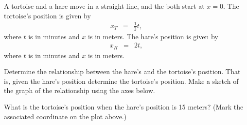 \begin{problem}
\begin{subproblem}
  \end{subproblem}

\clearpage

\item A tortoise and a hare move in a straight line, and the both
  start at $x=0$. The tortoise's position is given by
  \begin{eqnarray*}
    x_T & = & \frac{1}{2} t,
  \end{eqnarray*}
  where $t$ is in minutes and $x$ is in meters.  The hare's position
  is given by
  \begin{eqnarray*}
    x_H & = & 2 t,
  \end{eqnarray*}
  where $t$ is in minutes and $x$ is in meters.

  Determine the relationship between the hare's and the tortoise's
  position. That is, given the hare's position determine the
  tortoise's position. Make a sketch of the graph of the relationship using the axes below.



    What is the tortoise's position when the hare's position is 15
    meters? (Mark the associated coordinate on the plot above.)


\end{problem}


